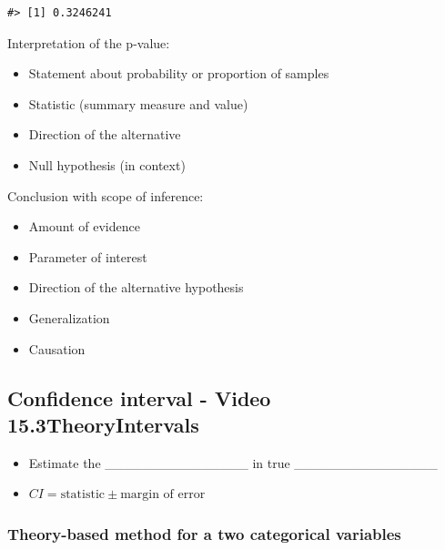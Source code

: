 \documentclass[
]{report}
\begin{document}
\begin{verbatim}
#> [1] 0.3246241
\end{verbatim}

Interpretation of the p-value:

\begin{itemize}
\item
  Statement about probability or proportion of samples
\item
  Statistic (summary measure and value)
\item
  Direction of the alternative
\item
  Null hypothesis (in context)
\end{itemize}

\vspace{0.8in}

Conclusion with scope of inference:

\begin{itemize}
\item
  Amount of evidence
\item
  Parameter of interest
\item
  Direction of the alternative hypothesis
\item
  Generalization
\item
  Causation
\end{itemize}

\vspace{0.6in}

\subsection*{Confidence interval - Video 15.3TheoryIntervals}\label{confidence-interval---video-15.3theoryintervals}

\begin{itemize}
\item
  Estimate the \_\_\_\_\_\_\_\_\_\_\_\_\_\_\_ in true \_\_\_\_\_\_\_\_\_\_\_\_\_\_\_
\item
  \(CI = \text{statistic} \pm \text{margin of error}\)
\end{itemize}

\subsubsection*{Theory-based method for a two categorical variables}\label{theory-based-method-for-a-two-categorical-variables}
\end{document}
